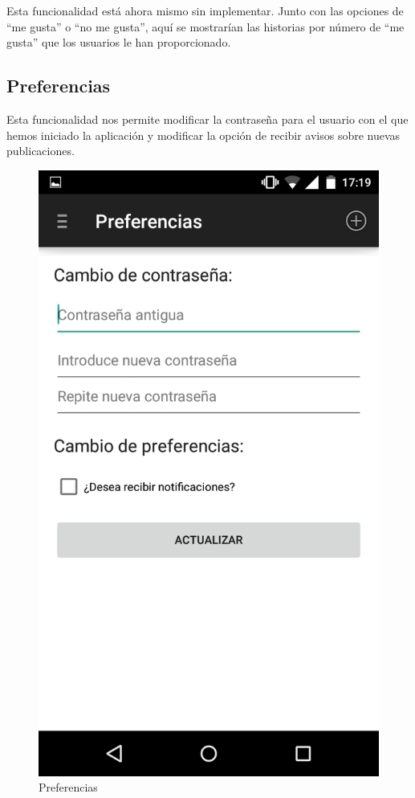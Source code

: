 \documentclass[11pt,a4paper, titlepage]{article}
\begin{document}
	Esta funcionalidad está ahora mismo sin implementar. Junto con las opciones de ``me gusta'' o ``no me gusta'', aquí se mostrarían las historias por número de ``me gusta'' que los usuarios le han proporcionado.
	
	\FloatBarrier
	\subsection[Preferencias]{Preferencias}
	
	Esta funcionalidad nos permite modificar la contraseña para el usuario con el que hemos iniciado la aplicación y modificar la opción de recibir avisos sobre nuevas publicaciones.
	
	\begin{figure}[hbtp]
		\centering
		\includegraphics[scale = 0.25 ]{img/9}
		\caption{Preferencias}
		\label{p16}
	\end{figure}
	
\end{document}
